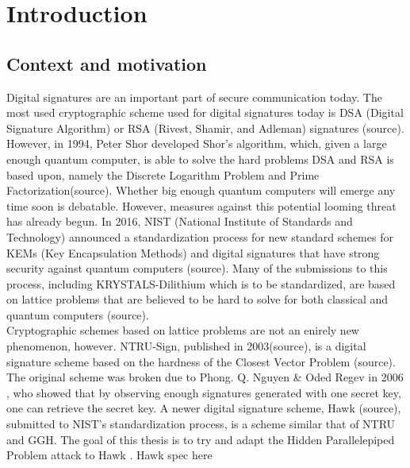 \chapter{Introduction}
\section{Context and motivation}
Digital signatures are an important part of secure communication today. The most used cryptographic scheme used for digital signatures today is DSA (Digital Signature Algorithm) or RSA (Rivest, Shamir, and Adleman) signatures (source).
However, in 1994, Peter Shor developed Shor's algorithm, which, given a large enough quantum computer, is able to solve the hard problems DSA and RSA is based upon, namely the Discrete Logarithm Problem and Prime Factorization(source). 
Whether big enough quantum computers will emerge any time soon is debatable. However, measures against this potential looming threat has already begun. In 2016, NIST (National Institute of Standards and Technology)
announced a standardization process for new standard schemes for KEMs (Key Encapsulation Methods) and digital signatures that have strong security against quantum computers (source). Many of the submissions to this process,
including KRYSTALS-Dilithium which is to be standardized, are based on lattice problems that are believed to be hard to solve for both classical and quantum computers (source). \hfill \break \\

Cryptographic schemes based on lattice problems are not an enirely new phenomenon, however. NTRU-Sign, published in 2003(source), is a digital signature scheme based on the hardness of the Closest Vector Problem (source).
The original scheme was broken due to Phong. Q. Nguyen \& Oded Regev in 2006 \cite{hpp}, who showed that by observing enough signatures generated with one secret key, one can retrieve the secret key.
A newer digital signature scheme, Hawk (source), submitted to NIST's standardization process, is a scheme similar that of NTRU and GGH. 
The goal of this thesis is to try and adapt the Hidden Parallelepiped Problem attack to Hawk \cite{hawk}. Hawk spec here \cite{hawkspec}

